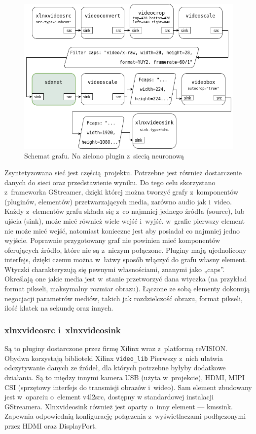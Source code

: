 \documentclass[12pt, oneside, a4paper]{article}
\begin{document}
\begin{figure}[h]
  \centering
  \includegraphics[width=0.9\linewidth]{figures/pipeline.png}
  \caption{Schemat grafu. Na zielono plugin z~siecią neuronową}\label{fig:pipeline}
\end{figure}
Zsyntetyzowana sieć jest częścią projektu. Potrzebne jest również dostarczenie
danych do sieci oraz przedstawienie wyniku.
Do tego celu skorzystano z~frameworka GStreamer, dzięki której można
tworzyć grafy z~komponentów (pluginów, elementów)
przetwarzających media, zarówno audio jak i~video.
Każdy z~elementów grafu składa się z~co najmniej jednego źródła (source),
lub ujścia (sink), może mieć również wiele wejść i~wyjść. w~grafie pierwszy
element nie może mieć wejść, natomiast konieczne jest aby posiadał co najmniej
jedno wyjście. Poprawnie przygotowany graf nie powinien mieć komponentów
oferujących źródło, które nie są z~niczym połączone.
Pluginy mają ujednolicony interfejs, dzięki czemu można w~łatwy sposób
włączyć do grafu własny element. Wtyczki charakteryzują się
pewnymi własnościami, znanymi jako „caps”. Określają one jakie 
media jest w~stanie przetworzyć dana wtyczka (na przykład format pikseli,
maksymalny rozmiar obrazu). 
Łączone ze sobą elementy dokonują negocjacji
parametrów mediów, takich jak rozdzielczość obrazu, format pikseli,
ilość klatek na sekundę oraz innych.

\subsubsection{xlnxvideosrc i~xlnxvideosink}\label{sec:xlnxvideosrc i xlnxvideosink}
Są to pluginy dostarczone przez firmę Xilinx wraz z~platformą reVISION.
Obydwa korzystają biblioteki Xilinx \lstinline{video_lib}
Pierwszy z~nich ułatwia odczytywanie danych ze źródeł, dla których potrzebne
byłyby dodatkowe działania. Są to między innymi kamera USB (użyta w~projekcie),
HDMI, MIPI CSI (sprzętowy interfejs do transmisji obrazów i~wideo).
Sam element zbudowany jest w~oparciu o~element v4l2src, dostępny
w standardowej instalacji GStreamera.
Xlnxvideosink również jest oparty o~inny element --- kmssink.
Zapewnia odpowiednią konfigurację połączenia z~wyświetlaczami
podłączonymi przez HDMI oraz DisplayPort.
\end{document}
